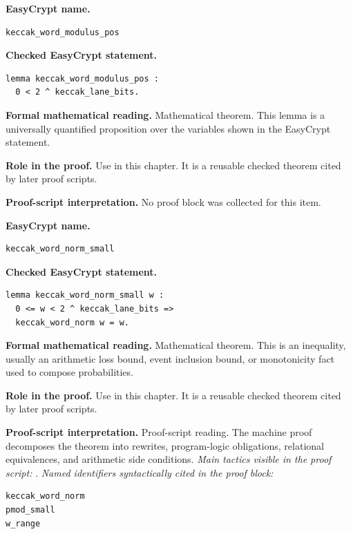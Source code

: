 \begin{formaltheorem}
\noindent\textbf{EasyCrypt name.}
\begin{lstlisting}[language=EasyCrypt,basicstyle=\ttfamily\scriptsize]
keccak_word_modulus_pos
\end{lstlisting}
\noindent\textbf{Checked EasyCrypt statement.}
\begin{lstlisting}[language=EasyCrypt,basicstyle=\ttfamily\scriptsize]
lemma keccak_word_modulus_pos :
  0 < 2 ^ keccak_lane_bits.
\end{lstlisting}
\noindent\textbf{Formal mathematical reading.}
Mathematical theorem. This lemma is a universally quantified proposition over the variables shown in the EasyCrypt statement.

\noindent\textbf{Role in the proof.}
Use in this chapter. It is a reusable checked theorem cited by later proof scripts.

\noindent\textbf{Proof-script interpretation.}
No proof block was collected for this item.

\end{formaltheorem}

\begin{formaltheorem}
\noindent\textbf{EasyCrypt name.}
\begin{lstlisting}[language=EasyCrypt,basicstyle=\ttfamily\scriptsize]
keccak_word_norm_small
\end{lstlisting}
\noindent\textbf{Checked EasyCrypt statement.}
\begin{lstlisting}[language=EasyCrypt,basicstyle=\ttfamily\scriptsize]
lemma keccak_word_norm_small w :
  0 <= w < 2 ^ keccak_lane_bits =>
  keccak_word_norm w = w.
\end{lstlisting}
\noindent\textbf{Formal mathematical reading.}
Mathematical theorem. This is an inequality, usually an arithmetic loss bound, event inclusion bound, or monotonicity fact used to compose probabilities.

\noindent\textbf{Role in the proof.}
Use in this chapter. It is a reusable checked theorem cited by later proof scripts.

\noindent\textbf{Proof-script interpretation.}
Proof-script reading. The machine proof decomposes the theorem into rewrites, program-logic obligations, relational equivalences, and arithmetic side conditions.
\emph{Main tactics visible in the proof script:} .
\emph{Named identifiers syntactically cited in the proof block:}
\begin{lstlisting}[language=EasyCrypt,basicstyle=\ttfamily\scriptsize]
keccak_word_norm
pmod_small
w_range
\end{lstlisting}

\end{formaltheorem}

